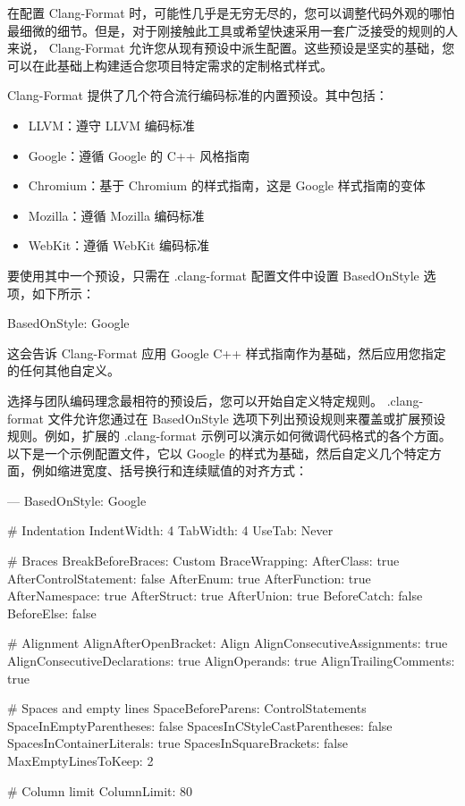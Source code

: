 

在配置 Clang-Format 时，可能性几乎是无穷无尽的，您可以调整代码外观的哪怕最细微的细节。但是，对于刚接触此工具或希望快速采用一套广泛接受的规则的人来说， Clang-Format 允许您从现有预设中派生配置。这些预设是坚实的基础，您可以在此基础上构建适合您项目特定需求的定制格式样式。


Clang-Format 提供了几个符合流行编码标准的内置预设。其中包括：

\begin{itemize}
\item
LLVM：遵守 LLVM 编码标准

\item
Google：遵循 Google 的 C++ 风格指南

\item
Chromium：基于 Chromium 的样式指南，这是 Google 样式指南的变体

\item
Mozilla：遵循 Mozilla 编码标准

\item
WebKit：遵循 WebKit 编码标准
\end{itemize}

要使用其中一个预设，只需在 .clang-format 配置文件中设置 BasedOnStyle 选项，如下所示：

\begin{shell}
BasedOnStyle: Google
\end{shell}

这会告诉 Clang-Format 应用 Google C++ 样式指南作为基础，然后应用您指定的任何其他自定义。


选择与团队编码理念最相符的预设后，您可以开始自定义特定规则。 .clang-format 文件允许您通过在 BasedOnStyle 选项下列出预设规则来覆盖或扩展预设规则。例如，扩展的 .clang-format 示例可以演示如何微调代码格式的各个方面。以下是一个示例配置文件，它以 Google 的样式为基础，然后自定义几个特定方面，例如缩进宽度、括号换行和连续赋值的对齐方式：

\begin{shell}
---
BasedOnStyle: Google

# Indentation
IndentWidth: 4
TabWidth: 4
UseTab: Never

# Braces
BreakBeforeBraces: Custom
BraceWrapping:
    AfterClass: true
    AfterControlStatement: false
    AfterEnum: true
    AfterFunction: true
    AfterNamespace: true
    AfterStruct: true
    AfterUnion: true
    BeforeCatch: false
    BeforeElse: false

# Alignment
AlignAfterOpenBracket: Align
AlignConsecutiveAssignments: true
AlignConsecutiveDeclarations: true
AlignOperands: true
AlignTrailingComments: true

# Spaces and empty lines
SpaceBeforeParens: ControlStatements
SpaceInEmptyParentheses: false
SpacesInCStyleCastParentheses: false
SpacesInContainerLiterals: true
SpacesInSquareBrackets: false
MaxEmptyLinesToKeep: 2

# Column limit
ColumnLimit: 80
\end{shell}

